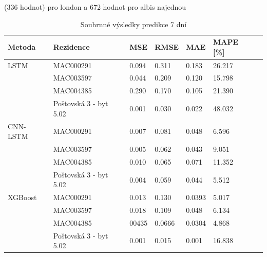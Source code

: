\documentclass[FM,BP,fonts]{tulthesis}
\begin{document}
(336 hodnot) pro london a 672 hodnot pro albis najednou
\begin{table}[!ht]
	\centering
	\caption{Souhrnné výsledky predikce 7 dní }
	\def\arraystretch{1.2}
	\begin{tabular}{lllllll}
		\hline
		\textbf{Metoda} & \textbf{Rezidence} & \textbf{MSE} & \textbf{RMSE} & \textbf{MAE} & \textbf{MAPE [\%]} \\      \hline
		LSTM            & MAC000291          &  0.094          & 0.311           & 0.183           & 26.217              \\ 
		~               & MAC003597          & 0.044            & 0.209             & 0.120            & 15.798             \\  
		~               & MAC004385          & 0.290            & 0.170             & 0.105           & 21.390            \\ 
		~               & Poštovská 3 - byt 5.02              & 0.001            & 0.030             & 0.022           & 48.032 \\         
		
		\hline
		
		CNN-LSTM        & MAC000291          & 0.007               & 0.081              & 0.048           & 6.596              \\ 
		~               & MAC003597          & 0.005            & 0.062             & 0.043            & 9.051             \\  
		~               & MAC004385          & 0.010            & 0.065             & 0.071           & 11.352            \\ 
		~               & Poštovská 3 - byt 5.02              & 0.004            & 0.059             & 0.044           &	5.512\\         
		
		\hline
		
		
		XGBoost         & MAC000291          & 0.013	       & 0.130             &  0.0393        &  5.017            \\ 
		~               & MAC003597          & 0.018            & 0.109             & 0.048            & 6.134             \\  
		~               & MAC004385          & 00435            & 0.0666             &  0.0304            &  4.868             \\ 
		~               & Poštovská 3 - byt 5.02  & 0.001          & 0.015             & 0.001            & 16.838\\   
		

\end{tabular}
\end{table}
\end{document}
